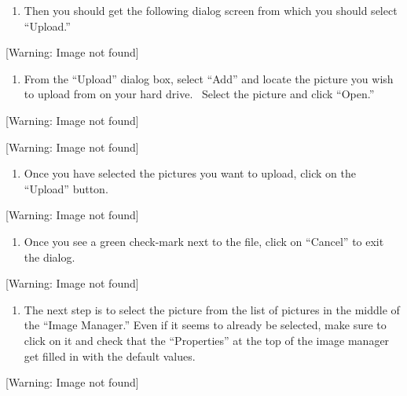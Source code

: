 \documentclass[12pt,twoside]{article}
\newcounter{saveenum}
\newcommand\liststyleLii{%
\renewcommand\theenumi{\arabic{enumi}}
\renewcommand\theenumii{\arabic{enumii}}
\renewcommand\theenumiii{\arabic{enumiii}}
\renewcommand\theenumiv{\arabic{enumiv}}
\renewcommand\labelenumi{2.\theenumi)}
\renewcommand\labelenumii{\theenumii.}
\renewcommand\labelenumiii{\theenumiii.}
\renewcommand\labelenumiv{\theenumiv.}
}
\begin{document}
\liststyleLii
\setcounter{saveenum}{\value{enumi}}
\begin{enumerate}
\setcounter{enumi}{\value{saveenum}}
\item {
Then you should get the following dialog screen from which you should
select ``Upload.''}
\end{enumerate}
{\centering{}
 [Warning: Image not found] 
\par}

\liststyleLii
\setcounter{saveenum}{\value{enumi}}
\begin{enumerate}
\setcounter{enumi}{\value{saveenum}}
\item {
From the ``Upload'' dialog box, select ``Add'' and locate the picture
you wish to upload from on your hard drive. \ Select the picture and
click ``Open.''}
\end{enumerate}
{\centering{}
 [Warning: Image not found] 
\par}

{\centering{}
 [Warning: Image not found] 
\par}

\liststyleLii
\setcounter{saveenum}{\value{enumi}}
\begin{enumerate}
\setcounter{enumi}{\value{saveenum}}
\item {
Once you have selected the pictures you want to upload, click on the
``Upload'' button.}
\end{enumerate}
{\centering{}
 [Warning: Image not found] 
\par}

\liststyleLii
\setcounter{saveenum}{\value{enumi}}
\begin{enumerate}
\setcounter{enumi}{\value{saveenum}}
\item {
Once you see a green check{}-mark next to the file, click on ``Cancel''
to exit the dialog.}
\end{enumerate}
{\centering{}
 [Warning: Image not found] 
\par}

\liststyleLii
\setcounter{saveenum}{\value{enumi}}
\begin{enumerate}
\setcounter{enumi}{\value{saveenum}}
\item {
The next step is to select the picture from the list of pictures in the
middle of the ``Image Manager.'' Even if it seems to already be
selected, make sure to click on it and check that the ``Properties'' at
the top of the image manager get filled in with the default values.}
\end{enumerate}
{\centering{}
 [Warning: Image not found] 
\par}
\end{document}

